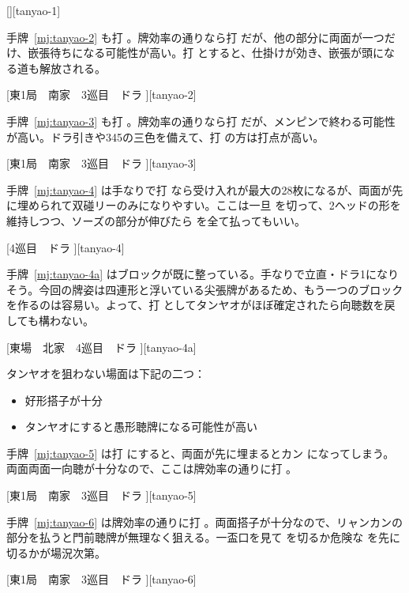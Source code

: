 \documentclass[../nankiru_main.tex]{subfiles}
\begin{document}
[][tanyao-1]

手牌~\ref{mj:tanyao-2} も打 。牌効率の通りなら打  だが、他の部分に両面が一つだけ、嵌張待ちになる可能性が高い。打  とすると、仕掛けが効き、嵌張が頭になる道も解放される。

[東1局　南家　3巡目　ドラ ][tanyao-2]

手牌~\ref{mj:tanyao-3} も打 。牌効率の通りなら打  だが、メンピンで終わる可能性が高い。ドラ引きや345の三色を備えて、打  の方は打点が高い。

[東1局　南家　3巡目　ドラ ][tanyao-3]

手牌~\ref{mj:tanyao-4} は手なりで打  なら受け入れが最大の28枚になるが、両面が先に埋められて双碰リーのみになりやすい。ここは一旦  を切って、2ヘッドの形を維持しつつ、ソーズの部分が伸びたら  を全て払ってもいい\citep[][pp.~68--69]{fkt}。

[4巡目　ドラ ][tanyao-4]

手牌~\ref{mj:tanyao-4a} はブロックが既に整っている。手なりで立直・ドラ1になりそう。今回の牌姿は四連形と浮いている尖張牌があるため、もう一つのブロックを作るのは容易い。よって、打  としてタンヤオがほぼ確定されたら向聴数を戻しても構わない\citep[pp.~70--71]{fkt}。

[東場　北家　4巡目　ドラ ][tanyao-4a]

タンヤオを狙わない場面は下記の二つ\citep[][p.~23]{zero-teyaku}：

\begin{itemize}
\item 好形搭子が十分
\item タンヤオにすると愚形聴牌になる可能性が高い
\end{itemize}

手牌~\ref{mj:tanyao-5} は打  にすると、両面が先に埋まるとカン  になってしまう。両面両面一向聴が十分なので、ここは牌効率の通りに打 。

[東1局　南家　3巡目　ドラ ][tanyao-5]

手牌~\ref{mj:tanyao-6} は牌効率の通りに打 。両面搭子が十分なので、リャンカンの部分を払うと門前聴牌が無理なく狙える。一盃口を見て  を切るか危険な  を先に切るかが場況次第。

[東1局　南家　3巡目　ドラ ][tanyao-6]
\end{document}

